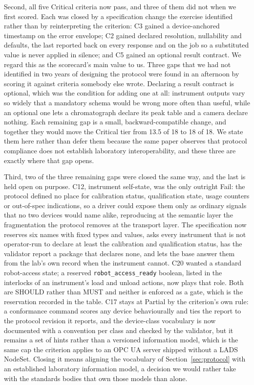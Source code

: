 \documentclass[11pt]{article}
\begin{document}
Second, all five Critical criteria now pass, and three of them did not when we first
scored. Each was closed by a specification change the exercise identified rather than by
reinterpreting the criterion: C3 gained a device-anchored timestamp on the error envelope;
C2 gained declared resolution, nullability and defaults, the last reported back on every
response and on the job so a substituted value is never applied in silence; and C5 gained an
optional result contract. We regard this as the scorecard's main value to us. Three gaps that
we had not identified in two years of designing the protocol were found in an afternoon by
scoring it against criteria somebody else wrote. Declaring a result contract is optional, which was
the condition for adding one at all: instrument outputs vary so widely that a mandatory
schema would be wrong more often than useful, while an optional one lets a chromatograph
declare its peak table and a camera declare nothing. Each remaining gap is a small,
backward-compatible change, and together they would move the Critical tier from 13.5 of 18 to
18 of 18. We state them here rather than defer them because the same paper observes that
protocol compliance does not establish laboratory interoperability, and these three are
exactly where that gap opens.

Third, two of the three remaining gaps were closed the same way, and the last is held open
on purpose. C12, instrument self-state, was the only outright Fail: the protocol defined no
place for calibration status, qualification state, usage counters or out-of-spec indications,
so a driver could expose them only as ordinary signals that no two devices would name alike,
reproducing at the semantic layer the fragmentation the protocol removes at the transport
layer. The specification now reserves six names with fixed types and values, asks every
instrument that is not operator-run to declare at least the calibration and qualification
status, has the validator report a package that declares none, and lets the base answer them
from the lab's own record when the instrument cannot. C20 wanted a standard robot-access
state; a reserved \texttt{robot\_access\_ready} boolean, listed in the interlocks of an
instrument's load and unload actions, now plays that role. Both are SHOULD rather than MUST
and neither is enforced as a gate, which is the reservation recorded in the table. C17 stays
at Partial by the criterion's own rule: a conformance command scores any device behaviourally
and ties the report to the protocol revision it reports, and the device-class vocabulary is
now documented with a convention per class and checked by the validator, but it remains a set
of hints rather than a versioned information model, which is the same cap the criterion
applies to an OPC UA server shipped without a LADS NodeSet. Closing it means aligning the
vocabulary of Section~\ref{sec:protocol} with an established laboratory information model,
a decision we would rather take with the standards bodies that own those models than alone.
\end{document}
